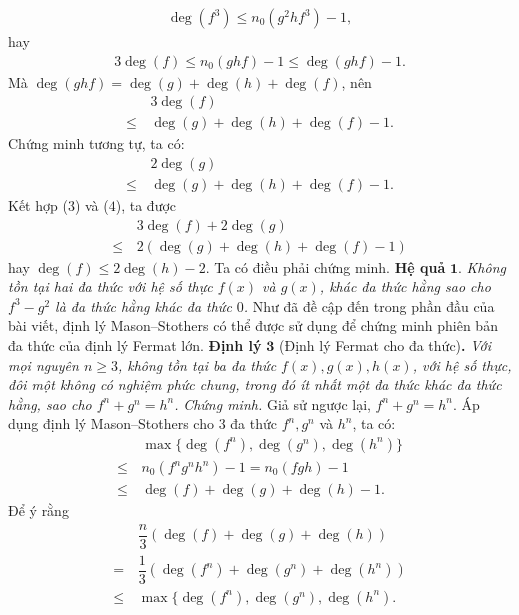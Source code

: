 \begin{multicols}{2}
	\begin{align*}
		\deg(f^3) \leq n_0{(g^2hf^3)} - 1,
	\end{align*}
	hay 
	\begin{align*}
		3\deg (f)\leq n_0{(ghf)}-1\leq \deg(ghf) - 1.
	\end{align*}
	Mà $\deg(ghf)= \deg(g) + \deg(h) +\deg(f)$, nên 
	\begin{align*}
		&3\deg(f)\\
		\leq \, &\deg(g) + \deg(h) +\deg(f)-1. \tag{$3$}
	\end{align*}
	Chứng minh tương tự, ta có:
	\begin{align*}
		&2\deg(g) \\
		\leq \, &\deg(g) + \deg(h) +\deg(f) - 1.\tag{$4$}
	\end{align*}
	Kết hợp ($3$) và ($4$), ta được
	\begin{align*}
		&3\deg(f) + 2\deg(g) \\
		\leq \,&2(\deg(g) + \deg(h) +\deg(f) - 1)
	\end{align*}
	hay $\deg(f) \leq 2\deg(h) - 2.$ Ta có điều phải chứng minh.
	\vskip 0.1cm
	\textbf{\color{hoccungpi}Hệ quả} $\pmb{1.}$
	\textit{Không tồn tại hai đa thức với hệ số thực $f(x)$ và $g(x)$, khác đa thức hằng sao cho $f^3-g^2$ là đa thức hằng khác đa thức $0$.}
	\vskip 0.1cm
	Như đã đề cập đến trong phần đầu của bài viết, định lý Mason--Stothers có thể được sử dụng để chứng minh phiên bản đa thức của định lý Fermat lớn.
	\vskip 0.1cm
	\textbf{\color{hoccungpi}Định lý} $\pmb{3}$ (Định lý Fermat cho đa thức)\textbf{\color{hoccungpi}.} \textit{Với mọi nguyên $n\ge 3$, không tồn tại ba đa thức $f(x),g(x),h(x)$, với hệ số thực, đôi một không có nghiệm phức chung, trong đó ít nhất một đa thức khác đa thức hằng, sao cho $f^n+g^n=h^n$.}
	\vskip 0.1cm
	\textit{Chứng minh.}
	Giả sử ngược lại, $f^n+g^n=h^n$. Áp dụng định lý Mason--Stothers cho $3$ đa thức $f^n, g^n$ và $h^n$, ta có:
	\begin{align*}
		&\max\{\deg(f^n), \deg(g^n), \deg(h^n)\} \\
		\le\, &n_0{(f^ng^nh^n)} - 1 = n_0{(fgh)} - 1 \\
		\le\, &\deg(f) + \deg(g) + \deg(h) - 1.
	\end{align*}
	Để ý rằng
	\begin{align*}
		&\dfrac{n}{3}(\deg(f) + \deg(g) + \deg(h)) \\
		=    \,&\dfrac{1}{3}(\deg(f^n) + \deg(g^n) + \deg(h^n)) \\
		\le\,& \max\{\deg(f^n), \deg(g^n), \deg (h^n).
	\end{align*}

\end{multicols}
